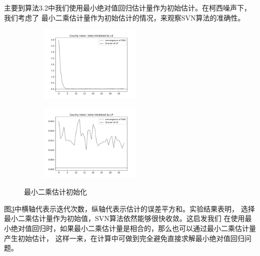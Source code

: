 主要到算法3.2中我们使用最小绝对值回归估计量作为初始估计。在柯西噪声下，我们考虑了
最小二乘估计量作为初始估计的情况，来观察SVN算法的准确性。

\begin{figure}[H]
    \centering
    \begin{subfigure}[t]{0.3\textwidth}\label{svn-demo2}
    \includegraphics[width=4.9cm]{pics/chapter2/l2-svn-demo.pdf}
    \end{subfigure}
    \begin{subfigure}[t]{0.3\textwidth}\label{svn-demo3}
    \includegraphics[width=4.9cm]{pics/chapter2/l1-svn-demo.pdf}
    \end{subfigure}
    \caption{ \small 最小二乘估计初始化}
    \label{svn-l2-demo}
\end{figure}

图\ref{svn-l2-demo}中横轴代表示迭代次数，纵轴代表示估计的误差平方和。实验结果表明，
选择最小二乘估计量作为初始值，SVN算法依然能够很快收敛。这启发我们
在使用最小绝对值回归时，如果最小二乘估计量是相合的，那么也可以通过最小二乘估计量产生初始估计，
这样一来，在计算中可做到完全避免直接求解最小绝对值回归问题。

